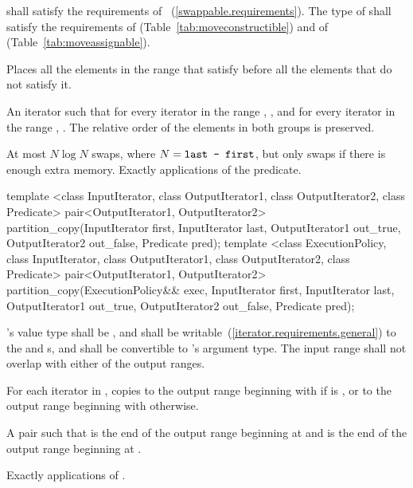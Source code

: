 \begin{itemdescr}
\pnum
\requires
{} shall satisfy the requirements of
~(\ref{swappable.requirements}). The type
of  shall satisfy the requirements of
 (Table~\ref{tab:moveconstructible}) and of
 (Table~\ref{tab:moveassignable}).

\pnum
\effects
Places all the elements in the range
that satisfy  before all the
elements that do not satisfy it.

\pnum
\returns
An iterator
such that for every iterator
in the range
,
,
and for every iterator
in the range
,
.
The relative order of the elements in both groups is preserved.

\pnum
\complexity
At most $N \log N$ swaps, where $N = \texttt{last - first}$,
but only  swaps if there is enough extra memory.
Exactly
applications of the predicate.
\end{itemdescr}

%
\begin{itemdecl}
template <class InputIterator, class OutputIterator1,
          class OutputIterator2, class Predicate>
  pair<OutputIterator1, OutputIterator2>
    partition_copy(InputIterator first, InputIterator last,
                   OutputIterator1 out_true, OutputIterator2 out_false,
                   Predicate pred);
template <class ExecutionPolicy, class InputIterator, class OutputIterator1,
          class OutputIterator2, class Predicate>
  pair<OutputIterator1, OutputIterator2>
    partition_copy(ExecutionPolicy&& exec,
                   InputIterator first, InputIterator last,
                   OutputIterator1 out_true, OutputIterator2 out_false,
                   Predicate pred);
\end{itemdecl}


\begin{itemdescr}
\pnum
\requires {}'s value type shall be , and shall be
writable~(\ref{iterator.requirements.general}) to the  and  s, and shall be
convertible to 's argument type. The input range shall not overlap with
either of the output ranges.

\pnum
\effects For each iterator  in , copies  to the output range beginning with  if  is , or to the output range beginning with  otherwise.

\pnum
\returns A pair  such that  is the end of the output range beginning at  and  is the end of the output range beginning at .

\pnum
\complexity Exactly  applications of .
\end{itemdescr}

